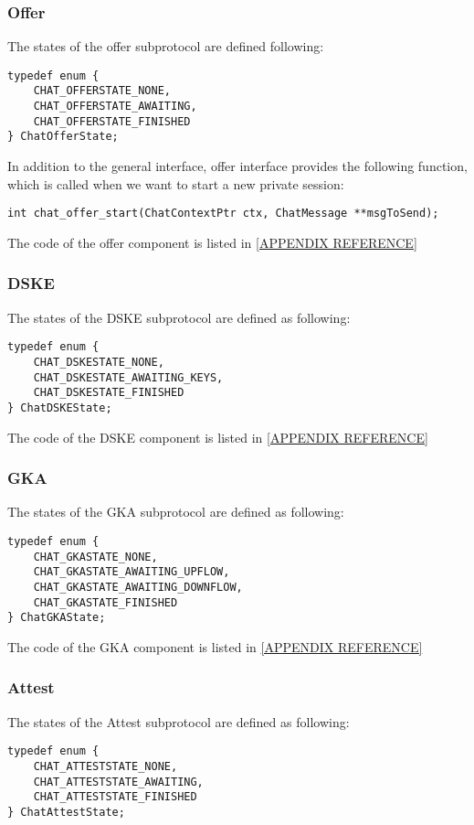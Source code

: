 \subsubsection{Offer}
The states of the offer subprotocol are defined following:
\begin{lstlisting}[caption={Offer states}]
typedef enum {
	CHAT_OFFERSTATE_NONE,
	CHAT_OFFERSTATE_AWAITING,
	CHAT_OFFERSTATE_FINISHED
} ChatOfferState;
\end{lstlisting}

In addition to the general interface, offer interface provides the following function, which is called when we want to start a new private session:
\begin{lstlisting}[caption={Offer specific interface}]
int chat_offer_start(ChatContextPtr ctx, ChatMessage **msgToSend);
\end{lstlisting}

The code of the offer component is listed in \ref{APPENDIX REFERENCE}

\subsubsection{DSKE}
The states of the DSKE subprotocol are defined as following:
\begin{lstlisting}[caption={DSKE states}]
typedef enum {
	CHAT_DSKESTATE_NONE,
	CHAT_DSKESTATE_AWAITING_KEYS,
	CHAT_DSKESTATE_FINISHED
} ChatDSKEState;
\end{lstlisting}

The code of the DSKE component is listed in \ref{APPENDIX REFERENCE}

\subsubsection{GKA}
The states of the GKA subprotocol are defined as following:
\begin{lstlisting}[caption={GKA states}]
typedef enum {
    CHAT_GKASTATE_NONE,
    CHAT_GKASTATE_AWAITING_UPFLOW,
    CHAT_GKASTATE_AWAITING_DOWNFLOW,
    CHAT_GKASTATE_FINISHED
} ChatGKAState;
\end{lstlisting}

The code of the GKA component is listed in \ref{APPENDIX REFERENCE}

\subsubsection{Attest}
The states of the Attest subprotocol are defined as following:
\begin{lstlisting}[caption={Attest states}]
typedef enum {
    CHAT_ATTESTSTATE_NONE,
    CHAT_ATTESTSTATE_AWAITING,
    CHAT_ATTESTSTATE_FINISHED
} ChatAttestState;
\end{lstlisting}

